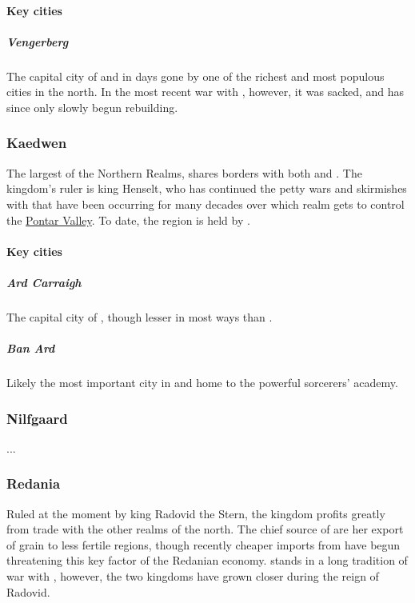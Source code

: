 \documentclass[parskip=full,11pt]{scrreport}
\begin{document}
\paragraph{Key cities}
\subparagraph{Vengerberg}\label{city:vengerberg}
The capital city of  and in days gone by one of the richest and most populous cities in the north. In the most recent war
with , however, it was sacked, and has since only slowly begun rebuilding.

\subsubsection{Kaedwen}\label{realm:kaedwen}
The largest of the Northern Realms,  shares borders with both  and .
The kingdom's ruler is king Henselt, who has continued the petty wars and skirmishes with  that have been occurring
for many decades over which realm gets to control the \hyperref[region:pontar]{Pontar Valley}. To date, the region is held by .

\paragraph{Key cities}
\subparagraph{Ard Carraigh}\label{city:ard_carraigh}
The capital city of , though lesser in most ways than .

\subparagraph{Ban Ard}\label{city:ban_ard}
Likely the most important city in  and home to the powerful sorcerers' academy.

\subsubsection{Nilfgaard}\label{realm:nilfgaard}
...

\subsubsection{Redania}\label{realm:redania}
Ruled at the moment by king Radovid the Stern, the kingdom profits greatly from trade with the other realms of the north.
The chief source of  are her export of grain to less fertile regions, though recently cheaper
imports from  have begun threatening this key factor of the Redanian economy.
 stands in a long tradition of war with , however, the two kingdoms have
grown closer during the reign of Radovid.
\end{document}
